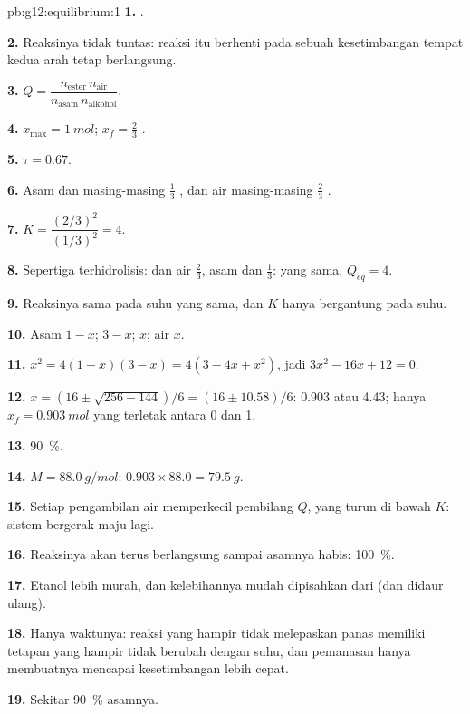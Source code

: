 \begin{solution}{pb:g12:equilibrium:1}
\textbf{1.} .

\textbf{2.} Reaksinya tidak tuntas: reaksi itu berhenti pada sebuah
kesetimbangan tempat kedua arah tetap berlangsung.

\textbf{3.} $Q = \dfrac{n_{\text{ester}}\, n_{\text{air}}}{n_{\text{asam}}\, n_{\text{alkohol}}}$.

\textbf{4.} $x_{\max} = \qty{1}{mol}$; $x_f = \frac{2}{3}$ .

\textbf{5.} $\tau = 0.67$.

\textbf{6.} Asam dan  masing-masing $\frac{1}{3}$ ,  dan
air masing-masing $\frac{2}{3}$ .

\textbf{7.} $K = \dfrac{(2/3)^2}{(1/3)^2} = 4$.

\textbf{8.} Sepertiga terhidrolisis:  dan air $\frac{2}{3}$, asam
dan  $\frac{1}{3}$:  yang sama, $Q_{eq} = 4$.

\textbf{9.} Reaksinya sama pada suhu yang sama, dan $K$ hanya
bergantung pada suhu.

\textbf{10.} Asam $1 - x$;  $3 - x$;  $x$; air $x$.

\textbf{11.} $x^2 = 4(1 - x)(3 - x) = 4(3 - 4x + x^2)$, jadi
$3x^2 - 16x + 12 = 0$.

\textbf{12.} $x = (16 \pm \sqrt{256 - 144})/6 = (16 \pm 10.58)/6$: 0.903
atau 4.43; hanya $x_f = \qty{0.903}{mol}$ yang terletak antara 0 dan 1.

\textbf{13.} \qty{90}{\percent}.

\textbf{14.} $M = \qty{88.0}{g/mol}$: $0.903 \times 88.0 = \qty{79.5}{g}$.

\textbf{15.} Setiap pengambilan air memperkecil pembilang $Q$, yang
turun di bawah $K$: sistem bergerak maju lagi.

\textbf{16.} Reaksinya akan terus berlangsung sampai asamnya habis:
\qty{100}{\percent}.

\textbf{17.} Etanol lebih murah, dan kelebihannya mudah dipisahkan dari
 (dan didaur ulang).

\textbf{18.} Hanya waktunya: reaksi yang hampir tidak melepaskan panas
memiliki tetapan yang hampir tidak berubah dengan suhu, dan pemanasan
hanya membuatnya mencapai kesetimbangan lebih cepat.

\textbf{19.} Sekitar \qty{90}{\percent} asamnya.
\end{solution}
